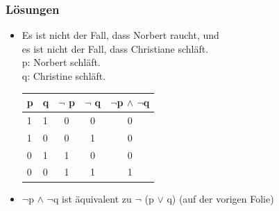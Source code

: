 {\begin{frame}
\end{frame}

\begin{frame}
\frametitle{Lösungen}


\begin{itemize}
\item[] Es ist nicht der Fall, dass Norbert raucht, und\\
        es ist nicht der Fall, dass Christiane schläft.\\
p: Norbert schläft.\\
q: Christine schläft.

\bigskip

\begin{tabular}{l|l|c|c|c}
p & q & $\lnot$ p & $\lnot$ q & $ \lnot $p $ \land $ $ \lnot $q\\
\hline
1 & 1 & 0 & 0 & 0\\
\hline
1 & 0 & 0 & 1 & 0\\
\hline
0 & 1 & 1 & 0 & 0\\
\hline
0 & 0 & 1 & 1 & 1\\
\end{tabular}

\bigskip

\item[] $\lnot $p $ \land $ $ \lnot $q ist äquivalent zu $\lnot $ (p $ \lor$ q) (auf der vorigen Folie)

\end{itemize}

\end{frame}
}%



